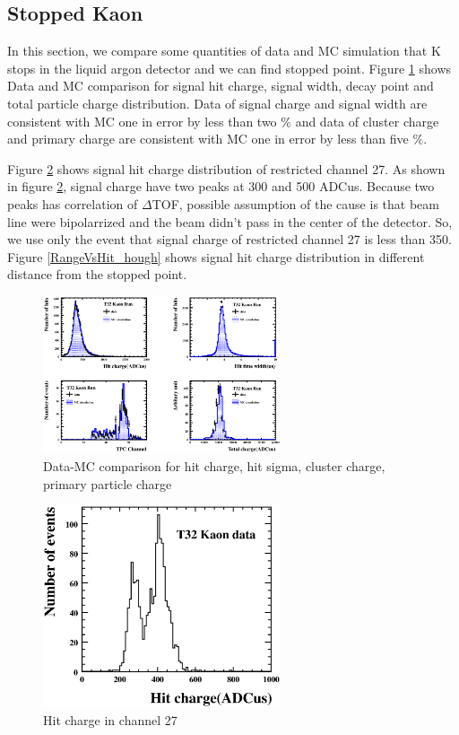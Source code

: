 \subsection{Stopped Kaon}
In this section, we compare some quantities of data and MC simulation that K stops in the liquid argon detector and we can find stopped point.
Figure \ref{KsomeQuantities} shows Data and MC comparison for signal hit charge, signal width, decay point and total particle charge distribution.
Data of signal charge and signal width are consistent with MC one in error by less than two $\%$ and data of cluster charge and primary charge are consistent with  MC one in error by less than five $\%$.

Figure \ref{cq27_hough} shows signal hit charge distribution of restricted channel 27. 
As shown in figure \ref{cq27_hough}, signal charge have two peaks at 300 and 500 ADCus.
Because two peaks has correlation of $\Delta$TOF, possible assumption of the cause is that beam line were bipolarrized and the beam didn't pass in the center of the detector.
So, we use only the event that signal charge of restricted channel 27 is less than 350.
Figure \ref{RangeVsHit_hough} shows signal hit charge distribution in different distance from the stopped point.

\begin{figure}[htbp]
  \begin{center}
    \includegraphics[width=70mm]{fig/cHit4_hough.eps}
  \end{center}    
    \caption{Data-MC comparison for hit charge, hit sigma, cluster charge, primary particle charge}
    \label{KsomeQuantities}
\end{figure}



\begin{figure}[!htb]
  \begin{center}
    \includegraphics[width=70mm]{fig/ch27distribution.eps}
  \end{center}
  \label{cq27_hough}
  \caption{Hit charge in channel 27}
\end{figure}


